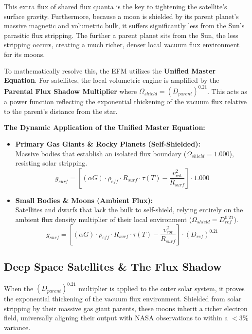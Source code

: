 \documentclass[11pt, a4paper]{article}
\begin{document}
This extra flux of shared flux quanta is the key to tightening the satellite's surface gravity. Furthermore, because a moon is shielded by its parent planet's massive magnetic and volumetric bulk, it suffers significantly less from the Sun's parasitic flux stripping. The further a parent planet sits from the Sun, the less stripping occurs, creating a much richer, denser local vacuum flux environment for its moons.

To mathematically resolve this, the EFM utilizes the \textbf{Unified Master Equation}. For satellites, the local volumetric engine is amplified by the \textbf{Parental Flux Shadow Multiplier} where $\Omega_{shield} = (D_{parent})^{0.21}$. This acts as a power function reflecting the exponential thickening of the vacuum flux relative to the parent's distance from the star.

\vspace{1.0em}
\noindent \textbf{The Dynamic Application of the Unified Master Equation:}
\begin{itemize}
  \item \textbf{Primary Gas Giants \& Rocky Planets (Self-Shielded):}
  \\Massive bodies that establish an isolated flux boundary ($\Omega_{shield} = 1.000$), resisting solar stripping.
  $$g_{surf} = \left[ (\alpha G) \cdot \rho_{eff} \cdot R_{surf} \cdot \tau(T) - \frac{v_{rot}^2}{R_{surf}} \right] \cdot 1.000$$

  \item \textbf{Small Bodies \& Moons (Ambient Flux):}
  \\Satellites and dwarfs that lack the bulk to self-shield, relying entirely on the ambient flux density multiplier of their local environment ($\Omega_{shield} = D_{ref}^{0.21}$).
  $$g_{surf} = \left[ (\alpha G) \cdot \rho_{eff} \cdot R_{surf} \cdot \tau(T) - \frac{v_{rot}^2}{R_{surf}} \right] \cdot (D_{ref})^{0.21}$$
\end{itemize}

\clearpage
\subsection{Deep Space Satellites \& The Flux Shadow}
When the $(D_{parent})^{0.21}$ multiplier is applied to the outer solar system, it proves the exponential thickening of the vacuum flux environment. Shielded from solar stripping by their massive gas giant parents, these moons inherit a richer electron field, universally aligning their output with NASA observations to within a $<3\%$ variance.
\end{document}
